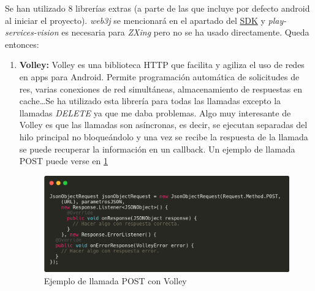 Se han utilizado 8 librerías extras (a parte de las que incluye por defecto android al iniciar el proyecto). \emph{web3j} se mencionará en el apartado del \hyperref[sec:SDK]{SDK} y \emph{play-services-vision} es necesaria para \emph{ZXing} pero no se ha usado directamente. Queda entonces: \\
\begin{enumerate}
\item \textbf{Volley: } Volley es una biblioteca HTTP que facilita y agiliza el uso de redes en apps para Android. Permite programación automática de solicitudes de res, varias conexiones de red simultáneas, almacenamiento de respuestas en cache\dots Se ha utilizado esta librería para todas las llamadas excepto la llamadas \emph{DELETE} ya que me daba problemas. Algo muy interesante de Volley es que las llamadas son asíncronas, es decir, se ejecutan separadas del hilo principal no bloqueándolo y una vez se recibe la respuesta de la llamada se puede recuperar la información en un callback. Un ejemplo de llamada POST puede verse en \ref{fig:post_volley} \\


\begin{figure}[h!]
  \centering
  \includegraphics[width=0.8\linewidth]{figs/Desarrollo/Codigo/POST_Volley}
  \caption[Llamada POST con Volley]{Ejemplo de llamada POST con Volley}
  \label{fig:post_volley}
\end{figure}


\end{enumerate}
